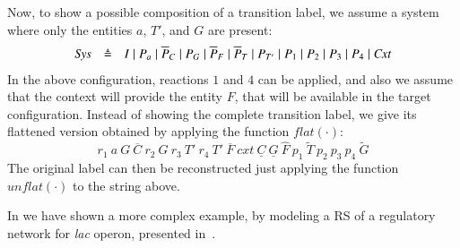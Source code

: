 Now, to show a possible composition of a transition label, we assume a system where only the entities $a$, $T'$, and $G$ are present:
\[
\begin{array}{lcl}
\mathit{Sys} &\defeq &%
I\mid P_a\mid \overline{P}_C\mid P_G\mid \overline{P}_F \mid \overline{P}_T \mid P_{T'} \mid P_1 \mid P_2 \mid P_3 \mid P_4 \mid \mathit{Cxt}
\end{array}
\]
In the above configuration, reactions $1$ and $4$ can be applied, and also we assume that the context will provide the entity $F$, that will be available in the target configuration.
Instead of showing the complete transition label, we give its flattened version obtained by applying the function $\mathit{flat}(\cdot)$:
\[
r_1~ a~G~\overline{C}~ r_2~ G~ r_3~T'~r_4~T'~\overline{F}~cxt~\underline{C}~\underline{G}~\widehat{F}~p_1~\widetilde{T}~p_2~p_3~p_4~\widetilde{G}
\]
The original label can then be reconstructed just applying the function $\mathit{unflat}(\cdot)$ to the string above.

In \cite{BBF19} we have shown a more complex example, by modeling a RS 
of a regulatory network for \emph{lac} operon, 
presented in~\cite{CMMBM12}.


